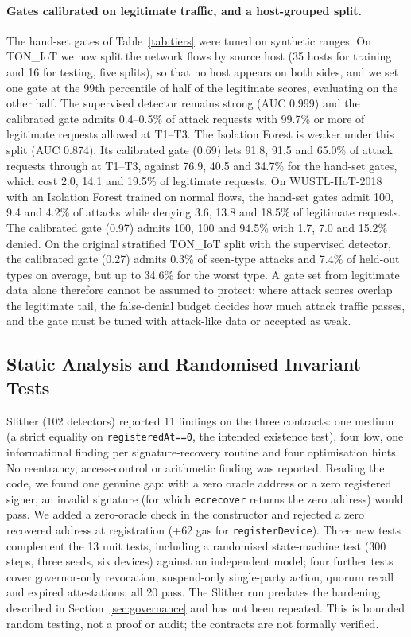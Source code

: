 \paragraph{Gates calibrated on legitimate traffic, and a host-grouped split.} The hand-set gates of Table~\ref{tab:tiers} were tuned on synthetic ranges. On TON\_IoT we now split the network flows by source host (35 hosts for training and 16 for testing, five splits), so that no host appears on both sides, and we set one gate at the 99th percentile of half of the legitimate scores, evaluating on the other half. The supervised detector remains strong (AUC 0.999) and the calibrated gate admits 0.4--0.5\% of attack requests with 99.7\% or more of legitimate requests allowed at T1--T3. The Isolation Forest is weaker under this split (AUC 0.874). Its calibrated gate (0.69) lets 91.8, 91.5 and 65.0\% of attack requests through at T1--T3, against 76.9, 40.5 and 34.7\% for the hand-set gates, which cost 2.0, 14.1 and 19.5\% of legitimate requests. On WUSTL-IIoT-2018 with an Isolation Forest trained on normal flows, the hand-set gates admit 100, 9.4 and 4.2\% of attacks while denying 3.6, 13.8 and 18.5\% of legitimate requests. The calibrated gate (0.97) admits 100, 100 and 94.5\% with 1.7, 7.0 and 15.2\% denied. On the original stratified TON\_IoT split with the supervised detector, the calibrated gate (0.27) admits 0.3\% of seen-type attacks and 7.4\% of held-out types on average, but up to 34.6\% for the worst type. A gate set from legitimate data alone therefore cannot be assumed to protect: where attack scores overlap the legitimate tail, the false-denial budget decides how much attack traffic passes, and the gate must be tuned with attack-like data or accepted as weak.

\subsection{Static Analysis and Randomised Invariant Tests}\label{sec:assure}
Slither (102 detectors) reported 11 findings on the three contracts: one medium (a strict equality on \texttt{registeredAt==0}, the intended existence test), four low, one informational finding per signature-recovery routine and four optimisation hints. No reentrancy, access-control or arithmetic finding was reported. Reading the code, we found one genuine gap: with a zero oracle address or a zero registered signer, an invalid signature (for which \texttt{ecrecover} returns the zero address) would pass. We added a zero-oracle check in the constructor and rejected a zero recovered address at registration (+62 gas for \texttt{registerDevice}). Three new tests complement the 13 unit tests, including a randomised state-machine test (300 steps, three seeds, six devices) against an independent model; four further tests cover governor-only revocation, suspend-only single-party action, quorum recall and expired attestations; all 20 pass. The Slither run predates the hardening described in Section~\ref{sec:governance} and has not been repeated. This is bounded random testing, not a proof or audit; the contracts are not formally verified.

